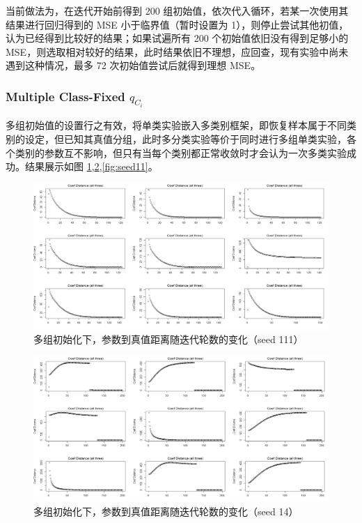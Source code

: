 \documentclass[12pt, a4paper, oneside]{article}
\numberwithin{equation}{section}
\begin{document}
当前做法为，在迭代开始前得到 200 组初始值，依次代入循环，若某一次使用其结果进行回归得到的 MSE 小于临界值（暂时设置为 1），则停止尝试其他初值，认为已经得到比较好的结果；如果试遍所有 200 个初始值依旧没有得到足够小的 MSE，则选取相对较好的结果，此时结果依旧不理想，应回查，现有实验中尚未遇到这种情况，最多 72 次初始值尝试后就得到理想 MSE。

\subsubsection{Multiple Class-Fixed $q_{C_i}$}

多组初始值的设置行之有效，将单类实验嵌入多类别框架，即恢复样本属于不同类别的设定，但已知其真值分组，此时多分类实验等价于同时进行多组单类实验，各个类别的参数互不影响，但只有当每个类别都正常收敛时才会认为一次多类实验成功。结果展示如图 \ref{fig:seed111},\ref{fig:seed14},\ref{fig:seed11}。

\begin{figure}
	\centering
	\includegraphics[width=\textwidth]{img/seed111.png}
	\caption{多组初始化下，参数到真值距离随迭代轮数的变化（seed 111）}
	\label{fig:seed111}
\end{figure}

\begin{figure}
	\centering
	\includegraphics[width=\textwidth]{img/seed14.png}
	\caption{多组初始化下，参数到真值距离随迭代轮数的变化（seed 14）}
	\label{fig:seed14}
\end{figure}
\end{document}
